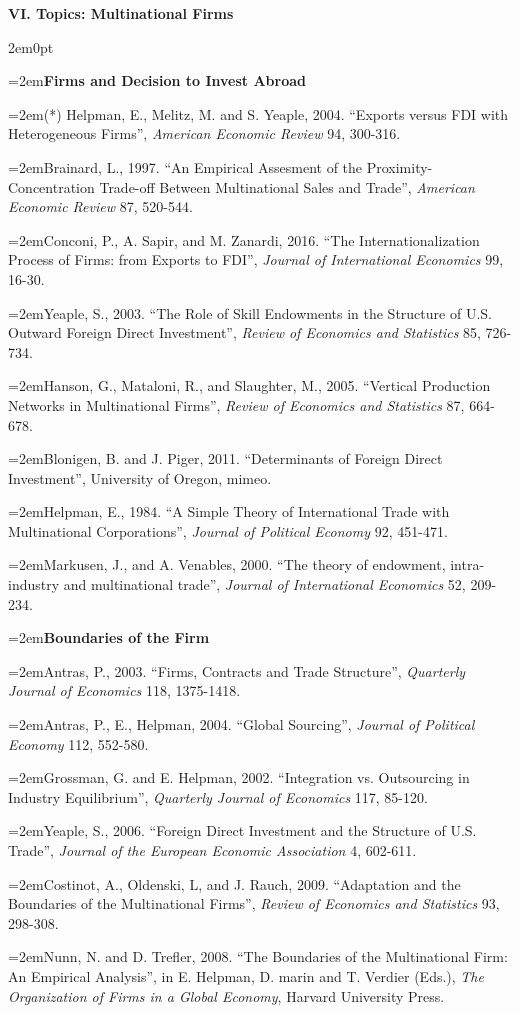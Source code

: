 \documentclass[10pt]{article}
\newcommand{\reading}{\par\hangindent=2em\hangafter=1\noindent}
\newenvironment{readingsblock}{%
  \begin{adjustwidth}{2em}{0pt} %
}{%
  \end{adjustwidth}
}
\begin{document}
  
\noindent \textbf{VI. Topics: Multinational Firms} \\[6pt]

  \begin{readingsblock}
  
  \reading \textbf{Firms and Decision to Invest Abroad} \\[4pt]
  
  \reading (*) Helpman, E., Melitz, M. and S. Yeaple, 2004. “Exports versus FDI with Heterogeneous Firms”, {\it American Economic Review} 94, 300-316.
  \reading Brainard, L., 1997. “An Empirical Assesment of the Proximity-Concentration Trade-off Between Multinational Sales and Trade”, {\it American Economic Review} 87, 520-544.
  \reading Conconi, P., A. Sapir, and M. Zanardi, 2016. “The Internationalization Process of Firms: from Exports to FDI”, {\it Journal of International Economics} 99, 16-30.
  \reading Yeaple, S., 2003. “The Role of Skill Endowments in the Structure of U.S. Outward Foreign Direct Investment”, {\it Review of Economics and Statistics} 85, 726-734.
  \reading Hanson, G., Mataloni, R., and Slaughter, M., 2005. “Vertical Production Networks in Multinational Firms”, {\it Review of Economics and Statistics} 87, 664-678.
  \reading Blonigen, B. and J. Piger, 2011. “Determinants of Foreign Direct Investment”, University of Oregon, mimeo.
  \reading Helpman, E., 1984. “A Simple Theory of International Trade with Multinational Corporations”, {\it Journal of Political Economy} 92, 451-471.
  \reading Markusen, J., and A. Venables, 2000. “The theory of endowment, intra-industry and multinational trade”, {\it Journal of International Economics} 52, 209-234. \\[4pt]
  
  
  \reading \textbf{Boundaries of the Firm} \\[4pt]
  
  \reading Antras, P., 2003. “Firms, Contracts and Trade Structure”, {\it Quarterly Journal of Economics} 118, 1375-1418.
  \reading Antras, P., E., Helpman, 2004. “Global Sourcing”, {\it Journal of Political Economy} 112, 552-580.
  \reading Grossman, G. and E. Helpman, 2002. “Integration vs. Outsourcing in Industry Equilibrium”, {\it Quarterly Journal of Economics} 117, 85-120.
  \reading Yeaple, S., 2006. “Foreign Direct Investment and the Structure of U.S. Trade”, {\it Journal of the European Economic Association} 4, 602-611.
  \reading Costinot, A., Oldenski, L, and J. Rauch, 2009. “Adaptation and the Boundaries of the Multinational Firms”, {\it Review of Economics and Statistics} 93, 298-308.
  \reading Nunn, N. and D. Trefler, 2008. “The Boundaries of the Multinational Firm: An Empirical Analysis”, in E. Helpman, D. marin and T. Verdier (Eds.), {\it The Organization of Firms in a Global Economy}, Harvard University Press. \\[4pt]
  

\end{readingsblock}
\end{document}
